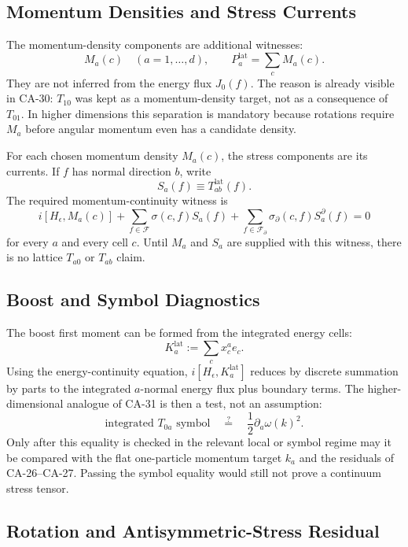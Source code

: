 \subsection{Momentum Densities and Stress Currents}

The momentum-density components are additional witnesses:
\[
  M_a(c)\quad (a=1,\ldots,d),
  \qquad
  P_a^{\mathrm{lat}}=\sum_c M_a(c).
\]
They are not inferred from the energy flux \(J_0(f)\).  The reason is already
visible in CA-30: \(T_{10}\) was kept as a momentum-density target, not as a
consequence of \(T_{01}\).  In higher dimensions this separation is mandatory
because rotations require \(M_a\) before angular momentum even has a candidate
density.

For each chosen momentum density \(M_a(c)\), the stress components are its
currents.  If \(f\) has normal direction \(b\), write
\[
  S_a(f)\equiv T_{ab}^{\mathrm{lat}}(f).
\]
The required momentum-continuity witness is
\[
  i[H_\epsilon,M_a(c)]
  +
  \sum_{f\in\mathcal F}\sigma(c,f)S_a(f)
  +
  \sum_{f\in\mathcal F_\partial}\sigma_\partial(c,f)S^\partial_a(f)
  =0
\]
for every \(a\) and every cell \(c\).  Until \(M_a\) and \(S_a\) are supplied
with this witness, there is no lattice \(T_{a0}\) or \(T_{ab}\) claim.

\subsection{Boost and Symbol Diagnostics}

The boost first moment can be formed from the integrated energy cells:
\[
  K_a^{\mathrm{lat}}:=\sum_c x_c^a e_c .
\]
Using the energy-continuity equation, \(i[H_\epsilon,K_a^{\mathrm{lat}}]\)
reduces by discrete summation by parts to the integrated \(a\)-normal energy
flux plus boundary terms.  The higher-dimensional analogue of CA-31 is then a
test, not an assumption:
\[
  \text{integrated }T_{0a}\text{ symbol}
  \quad\stackrel{?}{=}\quad
  \frac12\partial_a\omega(k)^2 .
\]
Only after this equality is checked in the relevant local or symbol regime may
it be compared with the flat one-particle momentum target \(k_a\) and the
residuals of CA-26--CA-27.  Passing the symbol equality would still not prove a
continuum stress tensor.

\subsection{Rotation and Antisymmetric-Stress Residual}

